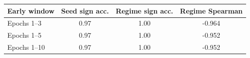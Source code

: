 \begin{tabular}{lccc}
  \toprule
  Early window & Seed sign acc. & Regime sign acc. & Regime Spearman \\
  \midrule
  Epochs 1--3 & 0.97 & 1.00 & -0.964 \\
  Epochs 1--5 & 0.97 & 1.00 & -0.952 \\
  Epochs 1--10 & 0.97 & 1.00 & -0.952 \\
  \bottomrule
\end{tabular}
